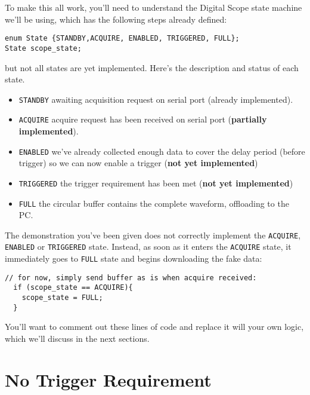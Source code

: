 \documentclass[12pt]{article}
\begin{document}
To make this all work, you'll need to understand the Digital Scope state machine we'll be using, which has the following steps already defined:
\begin{verbatim}
enum State {STANDBY,ACQUIRE, ENABLED, TRIGGERED, FULL};
State scope_state;
\end{verbatim}
but not all states are yet implemented.  Here's the description and status of each state.
\begin{itemize}
\item {\tt STANDBY} awaiting acquisition request on serial port (already implemented).
\item {\tt ACQUIRE} acquire request has been received on serial port ({\bf partially implemented}).
\item {\tt ENABLED} we've already collected enough data to cover the delay period (before trigger) so we can now enable a trigger ({\bf not yet implemented})
\item {\tt TRIGGERED} the trigger requirement has been met ({\bf not yet implemented})
\item {\tt FULL} the circular buffer contains the complete waveform, offloading to the PC.
\end{itemize}
The demonstration you've been given does not correctly implement the {\tt ACQUIRE}, {\tt ENABLED} or {\tt TRIGGERED} state.  Instead, as soon as it enters the {\tt ACQUIRE} state, it immediately goes to {\tt FULL} state and begins downloading the fake data:
\begin{verbatim}
// for now, simply send buffer as is when acquire received:
  if (scope_state == ACQUIRE){
    scope_state = FULL;
  }  
\end{verbatim} 
You'll want to comment out these lines of code and replace it will your own logic, which we'll discuss in the next sections.

\section{No Trigger Requirement}
\end{document}
